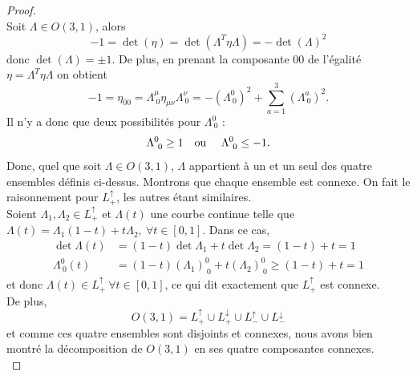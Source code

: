 \documentclass[a4paper,11pt]{report}
\theoremstyle{definition}
\theoremstyle{plain}
\theoremstyle{definition}
\theoremstyle{remark}
\begin{document}
            \begin{proof}
            ${}$\\
                Soit $\Lambda\in O(3,1)$, alors
                \begin{equation}
                    -1 = \det(\eta) = \det(\Lambda^T\eta\Lambda) = -\det(\Lambda)^2
                \end{equation}
                donc $\det(\Lambda) = \pm 1$. De plus, en prenant la composante $00$ de l'égalité $\eta = \Lambda^T\eta\Lambda$ on obtient
                \begin{equation}
                    -1 = \eta_{00} = \Lambda^\mu_{~0}\eta_{\mu\nu}\Lambda^\nu_{~0} = -(\Lambda^0_{~0})^2+\sum_{a=1}^3(\Lambda^a_{~0})^2.
                \end{equation}
                Il n'y a donc que deux possibilités pour $\Lambda^0_{~0}$ :
                \begin{equation}
                    \Lambda^0_{~0} \geq 1 \text{\quad ou \quad} \Lambda^0_{~0} \leq -1.
                \end{equation}
                Donc, quel que soit $\Lambda\in O(3,1)$, $\Lambda$ appartient à un et un seul des quatre ensembles définis ci-dessus. Montrons que chaque ensemble est connexe. On fait le raisonnement pour $L_+^\uparrow$, les autres étant similaires.\\
                Soient $\Lambda_1, \Lambda_2 \in L_+^\uparrow$ et $\Lambda(t)$ une courbe continue telle que $\Lambda(t) = \Lambda_1 (1 - t) + t\Lambda_2, ~\forall t \in [0,1]$. Dans ce cas, 
                \begin{align}
                    \det \Lambda(t) &= (1 - t)\det \Lambda_1 + t \det \Lambda_2 = (1 - t) + t = 1\\
                    \Lambda^0_{~0}(t) &= (1 - t)(\Lambda_1)^{0}_{~0} + t(\Lambda_2)^{0}_{~0} \ge (1 - t) + t = 1
                \end{align}
                et donc $\Lambda(t) \in L_+^\uparrow~\forall t \in [0,1]$, ce qui dit exactement que $L_+^\uparrow$ est connexe. \\
                De plus,  
                \begin{equation}
                    O(3, 1) = L_+^\uparrow \cup L_+^\downarrow \cup L_-^\uparrow \cup L_-^\downarrow 
                \end{equation}
                et comme ces quatre ensembles sont disjoints et connexes, nous avons bien montré la décomposition de $O(3, 1)$ en ses quatre composantes connexes.\\

\end{proof}
\end{document}
